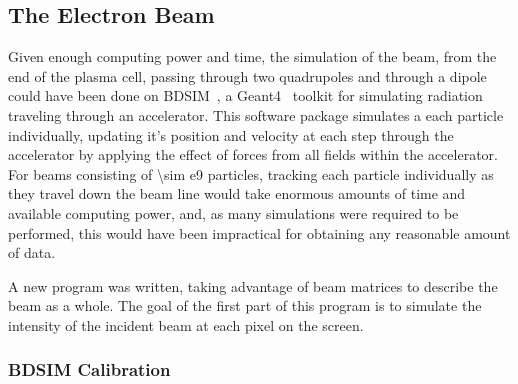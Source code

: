 \subsection{The Electron Beam}


Given enough computing power and time, the simulation of the beam, from the end
of the plasma cell, passing through two quadrupoles and through a dipole could
have been done on BDSIM~\cite{agapov2009bdsim}, a
Geant4~\cite{agostinelli2003geant4} toolkit for simulating radiation traveling
through an accelerator. This software package simulates a each particle
individually, updating it's position and velocity at each step through the
accelerator by applying the effect of forces from all fields within the
accelerator.  For beams consisting of \num{\sim e9} particles, tracking each
particle individually as they travel down the beam line would take enormous
amounts of time and available computing power, and, as many simulations were
required to be performed, this would have been impractical for obtaining any
reasonable amount of data.

A new program was written, taking advantage of beam matrices to describe the
beam as a whole. The goal of the first part of this program is to simulate the
intensity of the incident beam at each pixel on the screen.

\subsubsection{BDSIM Calibration}

